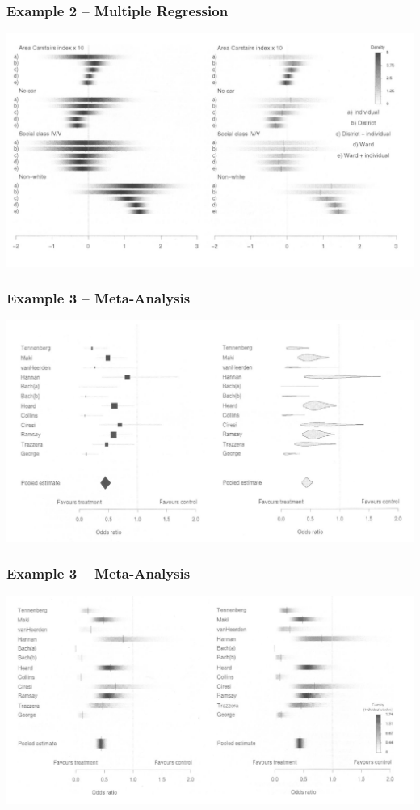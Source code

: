 \documentclass[11pt,usenames,dvipsnames,svgnames,x11names]{beamer}
\theoremstyle{plain}
\theoremstyle{definition}
\theoremstyle{remark}
\begin{document}
\begin{frame}
	\frametitle{Example 2 -- Multiple Regression}
	\centering
	\includegraphics[width=\textwidth]{eee.png}
\end{frame}

\begin{frame}
	\frametitle{Example 3 -- Meta-Analysis}
	\centering
	\includegraphics[width=\textwidth]{ff.png}
\end{frame}

\begin{frame}
	\frametitle{Example 3 -- Meta-Analysis}
	\centering
	\includegraphics[width=\textwidth]{fff.png}
\end{frame}
\end{document}
